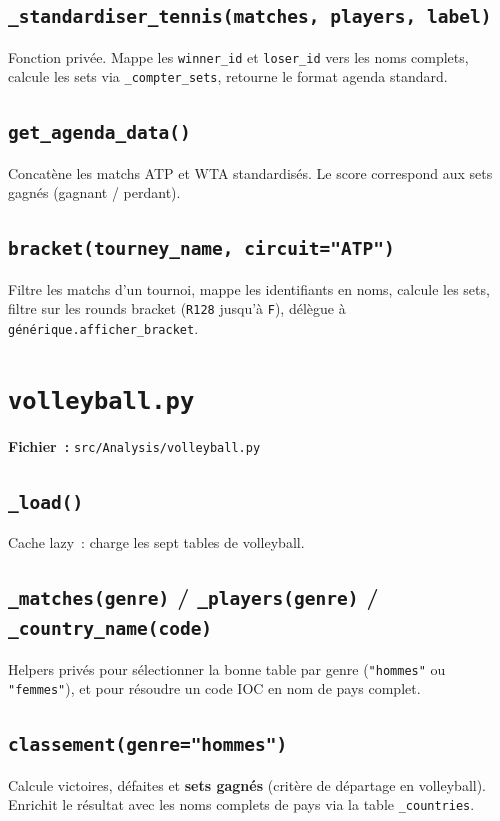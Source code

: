 \documentclass[12pt,a4paper]{article}
\begin{document}
\subsection{\texttt{\_standardiser\_tennis(matches, players, label)}}
Fonction privée. Mappe les \texttt{winner\_id} et \texttt{loser\_id} vers les
noms complets, calcule les sets via \texttt{\_compter\_sets}, retourne le
format agenda standard.

\subsection{\texttt{get\_agenda\_data()}}
Concatène les matchs ATP et WTA standardisés. Le score correspond aux
sets gagnés (gagnant / perdant).

\subsection{\texttt{bracket(tourney\_name, circuit="ATP")}}
Filtre les matchs d'un tournoi, mappe les identifiants en noms, calcule les
sets, filtre sur les rounds bracket (\texttt{R128} jusqu'à \texttt{F}),
délègue à \texttt{générique.afficher\_bracket}.

\section{\texttt{volleyball.py}}

\textbf{Fichier~:} \texttt{src/Analysis/volleyball.py}

\subsection{\texttt{\_load()}}
Cache lazy~: charge les sept tables de volleyball.

\subsection{\texttt{\_matches(genre)} / \texttt{\_players(genre)} / \texttt{\_country\_name(code)}}
Helpers privés pour sélectionner la bonne table par genre
(\texttt{"hommes"} ou \texttt{"femmes"}), et pour résoudre un code IOC
en nom de pays complet.

\subsection{\texttt{classement(genre="hommes")}}
Calcule victoires, défaites et \textbf{sets gagnés} (critère de départage
en volleyball). Enrichit le résultat avec les noms complets de pays via
la table \texttt{\_countries}.
\end{document}
